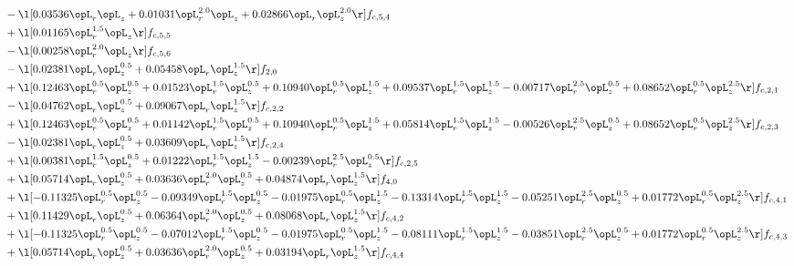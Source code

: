 \begin{alignat}{2}
& - \l[  0.03536 \opL_r \opL_z +  0.01031 \opL_r^{2.0} \opL_z +  0.02866 \opL_r \opL_z^{2.0}  \r] f_{c,5,4} \nonumber \\ 
& + \l[  0.01165 \opL_r^{1.5} \opL_z  \r] f_{c,5,5} \nonumber \\ 
& - \l[  0.00258 \opL_r^{2.0} \opL_z  \r] f_{c,5,6} \nonumber \\ 
& - \l[  0.02381 \opL_r \opL_z^{0.5} +  0.05458 \opL_r \opL_z^{1.5}  \r] f_{2,0} \nonumber \\ 
& + \l[  0.12463 \opL_r^{0.5} \opL_z^{0.5} +  0.01523 \opL_r^{1.5} \opL_z^{0.5} +  0.10940 \opL_r^{0.5} \opL_z^{1.5} +  0.09537 \opL_r^{1.5} \opL_z^{1.5}   -0.00717 \opL_r^{2.5} \opL_z^{0.5} +  0.08652 \opL_r^{0.5} \opL_z^{2.5}  \r] f_{c,2,1} \nonumber \\ 
& - \l[  0.04762 \opL_r \opL_z^{0.5} +  0.09067 \opL_r \opL_z^{1.5}  \r] f_{c,2,2} \nonumber \\ 
& + \l[  0.12463 \opL_r^{0.5} \opL_z^{0.5} +  0.01142 \opL_r^{1.5} \opL_z^{0.5} +  0.10940 \opL_r^{0.5} \opL_z^{1.5} +  0.05814 \opL_r^{1.5} \opL_z^{1.5}   -0.00526 \opL_r^{2.5} \opL_z^{0.5} +  0.08652 \opL_r^{0.5} \opL_z^{2.5}  \r] f_{c,2,3} \nonumber \\ 
& - \l[  0.02381 \opL_r \opL_z^{0.5} +  0.03609 \opL_r \opL_z^{1.5}  \r] f_{c,2,4} \nonumber \\ 
& + \l[  0.00381 \opL_r^{1.5} \opL_z^{0.5} +  0.01222 \opL_r^{1.5} \opL_z^{1.5}   -0.00239 \opL_r^{2.5} \opL_z^{0.5}  \r] f_{c,2,5} \nonumber \\ 
& + \l[  0.05714 \opL_r \opL_z^{0.5} +  0.03636 \opL_r^{2.0} \opL_z^{0.5} +  0.04874 \opL_r \opL_z^{1.5}  \r] f_{4,0} \nonumber \\ 
& + \l[  -0.11325 \opL_r^{0.5} \opL_z^{0.5}   -0.09349 \opL_r^{1.5} \opL_z^{0.5}   -0.01975 \opL_r^{0.5} \opL_z^{1.5}   -0.13314 \opL_r^{1.5} \opL_z^{1.5}   -0.05251 \opL_r^{2.5} \opL_z^{0.5} +  0.01772 \opL_r^{0.5} \opL_z^{2.5}  \r] f_{c,4,1} \nonumber \\ 
& + \l[  0.11429 \opL_r \opL_z^{0.5} +  0.06364 \opL_r^{2.0} \opL_z^{0.5} +  0.08068 \opL_r \opL_z^{1.5}  \r] f_{c,4,2} \nonumber \\ 
& + \l[  -0.11325 \opL_r^{0.5} \opL_z^{0.5}   -0.07012 \opL_r^{1.5} \opL_z^{0.5}   -0.01975 \opL_r^{0.5} \opL_z^{1.5}   -0.08111 \opL_r^{1.5} \opL_z^{1.5}   -0.03851 \opL_r^{2.5} \opL_z^{0.5} +  0.01772 \opL_r^{0.5} \opL_z^{2.5}  \r] f_{c,4,3} \nonumber \\ 
& + \l[  0.05714 \opL_r \opL_z^{0.5} +  0.03636 \opL_r^{2.0} \opL_z^{0.5} +  0.03194 \opL_r \opL_z^{1.5}  \r] f_{c,4,4} \nonumber \\ 

\end{alignat}
